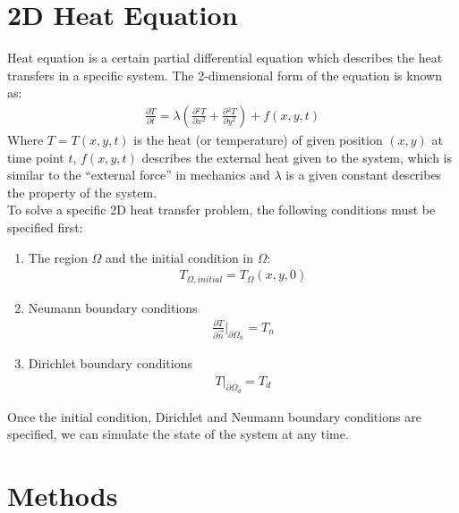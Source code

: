 \documentclass[conference]{IEEEtran}
\begin{document}
\section{2D Heat Equation}
Heat equation is a certain partial differential equation which describes the heat transfers in a specific system. 
The 2-dimensional form of the equation is known as:
\begin{align}\nonumber
    \frac{\partial{T}}{\partial{t}} = \lambda(\frac{\partial {^2 T}}{\partial{x^2}} + \frac{\partial {^2 T}}{\partial{y^2}}) + f(x, y, t)
\end{align}
Where $T = T(x, y, t)$ is the heat (or temperature) of given position $(x, y)$ at time point $t$, 
$f(x, y, t)$ describes the external heat given to the system, which is similar to the ``external force'' 
in mechanics and $\lambda$ is a given constant describes the property of the system.\\
To solve a specific 2D heat transfer problem, the following conditions must be specified first:
\begin{enumerate}
    \item The region $\Omega$ and the initial condition in $\Omega$:
        \begin{align}\nonumber T_{\Omega, initial} = T_{\Omega}(x, y, 0) \end{align}
    \item Neumann boundary conditions
        \begin{align}\nonumber \frac{\partial{T}}{\partial{\vec{n}}}\big |_{\partial{\Omega_n}} = T_{n} \end{align}
    \item Dirichlet boundary conditions
        \begin{align}\nonumber T\big| _{\partial{\Omega_d}} = T_{d} \end{align}
\end{enumerate}
Once the initial condition, Dirichlet and Neumann boundary conditions are specified, 
we can simulate the state of the system at any time.


\section{Methods}
\end{document}
